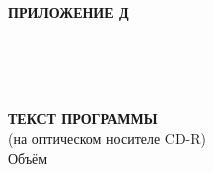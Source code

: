 \begin{ESKDtitlePage}
  \begin{flushright}
    \textbf{ПРИЛОЖЕНИЕ Д} \enspace\enspace
  \end{flushright}
  
  \begin{center}
    \envDiplomEducation \\
    \envDiplomUniversity \\
    \envDiplomCathedra \\
  \end{center}

  \vfill

  \begin{center}
    \textbf{ТЕКСТ ПРОГРАММЫ} \\
    (на оптическом носителе CD-R) \\
    Объём~\envDiplomDiskSize \\
  \end{center}

  \vfill

  \begin{center}
    \envCode \\
  \end{center}

  \vfill

  

  \vfill

  \begin{center}
    \ESKDtheYear
  \end{center}
\end{ESKDtitlePage}
